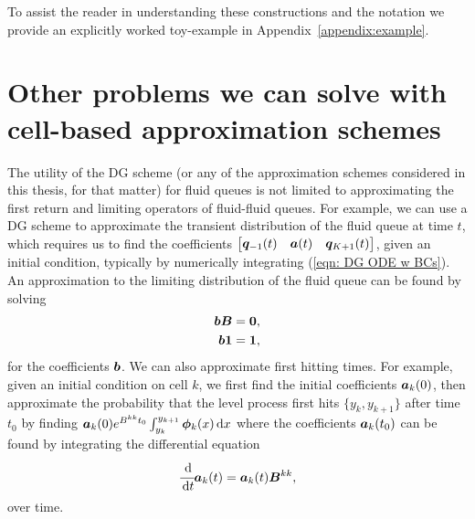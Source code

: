 To assist the reader in understanding these constructions and the notation we provide an explicitly worked toy-example in Appendix~\ref{appendix:example}.


\section{Other problems we can solve with cell-based approximation schemes}\label{sec: other applications}
The utility of the DG scheme (or any of the approximation schemes considered in this thesis, for that matter) for fluid queues is not limited to approximating the first return and limiting operators of fluid-fluid queues. For example, we can use a DG scheme to approximate the transient distribution of the fluid queue at time \(t\), which requires us to find the coefficients \(\begin{bmatrix} \boldsymbol q_{-1}(t) & \boldsymbol a(t) & \boldsymbol q_{{K+1}}(t) \end{bmatrix}\), given an initial condition, typically by numerically integrating (\ref{eqn: DG ODE w BCs}). An approximation to the limiting distribution of the fluid queue can be found by solving 
\begin{align*}
	\boldsymbol b \boldsymbol B &= \boldsymbol 0,
	\\ \boldsymbol b \boldsymbol 1 &= \boldsymbol 1,
\end{align*}
for the coefficients \(\boldsymbol b\). We can also approximate first hitting times. For example, given an initial condition on cell \(k\), we first find the initial coefficients \(\boldsymbol a_k(0)\), then approximate the probability that the level process first hits \(\{y_k,y_{k+1}\}\) after time \(t_0\) by finding \(\boldsymbol a_k(0)e^{B^{kk} t_0}\int_{y_k}^{y_{k+1}}\boldsymbol \phi_k(x)\, \mathrm{d} x\) where the coefficients \(\boldsymbol a_k(t_0)\) can be found by integrating the differential equation 
\[\cfrac{\, \mathrm{d}}{\, \mathrm{d} t}\boldsymbol a_k(t)=\boldsymbol a_k(t)\boldsymbol B^{kk},\]
over time. 


